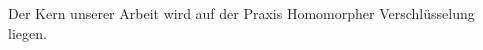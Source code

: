 \label{sec:kern}
    Der Kern unserer Arbeit wird auf der Praxis Homomorpher Verschlüsselung liegen.